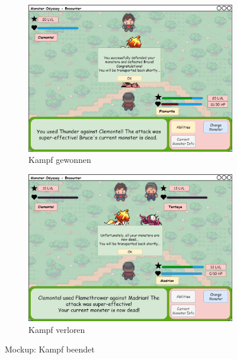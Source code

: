 \begin{figure}[H]
    \centering
    \begin{subfigure}[b]{0.4\textwidth}
        \includegraphics[width=\textwidth]{images/mockups/Encounter/Encounter1v1AbilitiesUsedWonGoBack.png}
        \caption{Kampf gewonnen}
        \label{fig: Encounter gewonnen Ankündigung}
    \end{subfigure}
    \hfill
    \begin{subfigure}[b]{0.4\textwidth}
        \includegraphics[width=\textwidth]{images/mockups/Encounter/Encounter1v2OpponentAttackedAndLostPopup.png}
        \caption{Kampf verloren}
        \label{fig: Encounter verloren Ankündigung}
    \end{subfigure}
    \caption{Mockup: Kampf beendet}
    \label{fig: Encounter beendet}
\end{figure}

